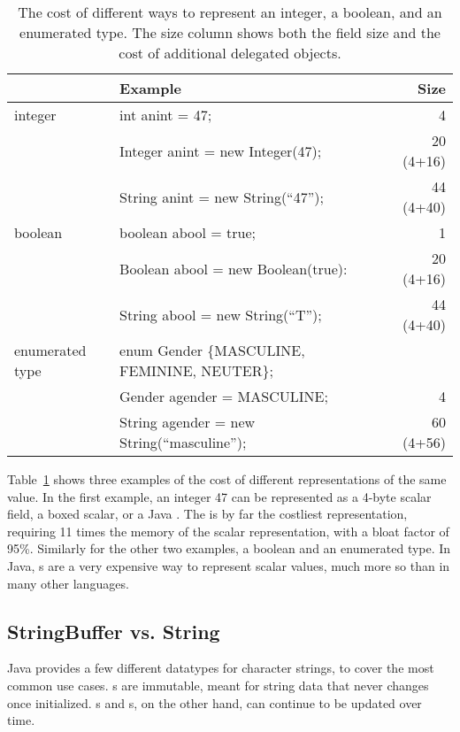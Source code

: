 \begin{table}
  \centering
\begin{tabular}{llr} \toprule \toprule
& Example & Size \\ \midrule \midrule
integer & int anint = 47; & 4 \\
\midrule
& Integer anint = new Integer(47); & 20 (4+16)  \\
\midrule
& String anint = new String(``47''); & 44 (4+40) \\
\midrule
\midrule
boolean & boolean abool = true; & 1\\
\midrule
& Boolean abool = new Boolean(true): & 20 (4+16) \\
\midrule
& String abool = new String(``T''); & 44 (4+40) \\
\midrule \midrule
enumerated type & enum Gender \{MASCULINE, FEMININE, NEUTER\}; &\\
& Gender agender = MASCULINE; & 4 \\
\midrule
& String agender = new String(``masculine''); & 60 (4+56) \\
\bottomrule \bottomrule
\end{tabular}
\caption{The cost of different ways to represent an integer, a boolean, and an
enumerated type. The size column shows both the field size and the cost of
additional delegated objects.}
\label{tab:data-sizes}
\end{table}

Table~\ref{tab:data-sizes} shows three examples of the cost of different
representations of the same value. In the first example, an integer 47 can be
represented as a 4-byte scalar field, a boxed scalar, or a Java . 
The  is by far the costliest representation, requiring 11 times
the memory of the scalar representation, with a bloat factor of 95\%. Similarly for the other two examples,
a boolean and an enumerated type. In Java, s are a very
expensive way to represent scalar values, much more so than in many other
languages.

\subsection{StringBuffer vs. String}
Java provides a few different datatypes for character strings, to cover the most
common use cases. s are immutable, meant for string data that never
changes once initialized. s and
s, on the other hand, can continue to be updated over time.

